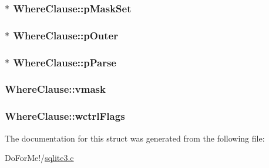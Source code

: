 \hypertarget{struct_where_clause_ae308a1600721b7dfa0855136926a5554}{
\subsubsection[{p\-Mask\-Set}]{$\ast$ Where\-Clause\-::p\-Mask\-Set}}\label{struct_where_clause_ae308a1600721b7dfa0855136926a5554}
\hypertarget{struct_where_clause_a6f72d61f416a323f39a8d3e2be62f607}{
\subsubsection[{p\-Outer}]{$\ast$ Where\-Clause\-::p\-Outer}}\label{struct_where_clause_a6f72d61f416a323f39a8d3e2be62f607}
\hypertarget{struct_where_clause_a3ff6dfc93e7b9b97a9bf9a0618a1d542}{
\subsubsection[{p\-Parse}]{$\ast$ Where\-Clause\-::p\-Parse}}\label{struct_where_clause_a3ff6dfc93e7b9b97a9bf9a0618a1d542}
\hypertarget{struct_where_clause_aaef3dd42bb6c23890d8ad8824e2a00ee}{
\subsubsection[{vmask}]{ Where\-Clause\-::vmask}}\label{struct_where_clause_aaef3dd42bb6c23890d8ad8824e2a00ee}
\hypertarget{struct_where_clause_a65f8d6f982be80ca3336483ddb8a2f3e}{
\subsubsection[{wctrl\-Flags}]{ Where\-Clause\-::wctrl\-Flags}}\label{struct_where_clause_a65f8d6f982be80ca3336483ddb8a2f3e}


The documentation for this struct was generated from the following file\-:\begin{DoxyCompactItemize}
\item 
Do\-For\-Me!/\hyperlink{sqlite3_8c}{sqlite3.\-c}\end{DoxyCompactItemize}
